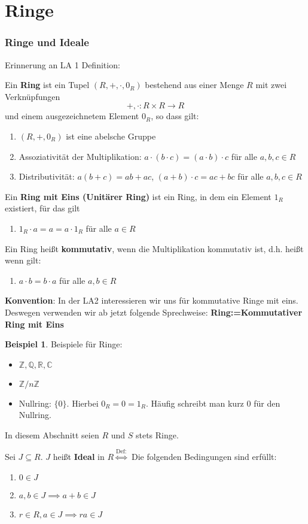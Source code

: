 \documentclass[a4paper, titlepage]{article}
\theoremstyle{definition}
\newtheorem{bsp}[satz]{Beispiel}
\newcommand{\R}{\mathbb{R}}
\newcommand{\Z}{\mathbb{Z}}
\newcommand{\Q}{\mathbb{Q}}
\newcommand{\C}{\mathbb{C}}
\begin{document}
\part{Ringe}
\section{Ringe und Ideale}
Erinnerung an LA 1 Definition:
\begin{definition}
	Ein \textbf{Ring} ist ein Tupel $(R,+,\cdot,0_R)$ bestehend aus einer Menge $R$ mit zwei Verknüpfungen 
	$$+,\cdot:R\times R\rightarrow R$$
	und einem ausgezeichnetem Element $0_R$, so dass gilt:
	\begin{enumerate}[(R1)]
		\item $(R,+,0_R)$ ist eine abelsche Gruppe 
		\item Assoziativität der Multiplikation: $a\cdot(b\cdot c)=(a\cdot b)\cdot c$ für alle $a,b,c\in R$
		\item Distributivität: $a(b+c)=ab+ac$, $(a+b)\cdot c=ac+bc$ für alle $a,b,c\in R$
	\end{enumerate}
	Ein \textbf{Ring mit Eins (Unitärer Ring)} ist ein Ring, in dem ein Element $1_R$ existiert, für das gilt
	\begin{enumerate}[(R4)]
		\item $1_R\cdot a = a = a \cdot 1_R$ für alle $a \in R$
	\end{enumerate}
	Ein Ring heißt \textbf{kommutativ}, wenn die Multiplikation kommutativ ist, d.h. heißt wenn gilt:
	\begin{enumerate}[(R5)]
		\item $a\cdot b = b \cdot a$ für alle $a,b\in R$
	\end{enumerate}
\end{definition}
\textbf{Konvention}: In der LA2 interessieren wir uns für kommutative Ringe mit eins. Deswegen verwenden wir ab jetzt folgende Sprechweise:
\textbf{Ring:=Kommutativer Ring mit Eins}
\begin{bsp} Beispiele für Ringe:
	\begin{itemize} 
		\item $\Z,\Q,\R,\C$
		\item $\Z/n\Z$
		\item Nullring: $\{0\}$. Hierbei $0_R=0=1_R$. Häufig schreibt man kurz 0 für den Nullring.
	\end{itemize}
\end{bsp}
In diesem Abschnitt seien $R$ und $S$ stets Ringe.
\begin{definition}
	Sei $J\subseteq R$. $J$ heißt \textbf{Ideal} in $R \overset{\text{Def:}}{\Leftrightarrow}$ Die folgenden Bedingungen sind erfüllt:
	\begin{enumerate}[(J1)]
		\item  $0\in J$
		\item $a,b \in J \implies a+b\in J$
		\item $r\in R, a \in J \implies ra \in J$
	\end{enumerate}
\end{definition}
\end{document}
